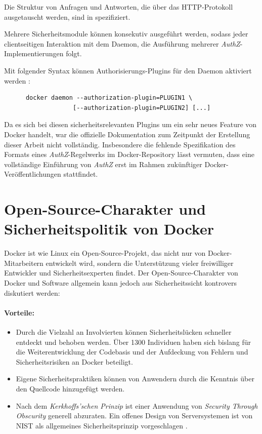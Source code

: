 \documentclass[../main.tex]{subfiles}
\begin{document}
    Die Struktur von Anfragen und Antworten, die über das HTTP-Protokoll ausgetauscht werden, sind in \cite{githubAuthZExtended} spezifiziert.

    Mehrere Sicherheitsmodule können konsekutiv ausgeführt werden, sodass jeder clientseitigen Interaktion mit dem Daemon, die Ausführung mehrerer \emph{AuthZ}-Implementierungen folgt.

    Mit folgender Syntax können Authorisierungs-Plugins für den Daemon aktiviert werden \cite{githubAuthZExtended}:

    \begin{lstlisting}
      docker daemon --authorization-plugin=PLUGIN1 \
                   [--authorization-plugin=PLUGIN2] [...]
    \end{lstlisting}

    Da es sich bei diesen sicherheitsrelevanten Plugins um ein sehr neues Feature von Docker handelt, war die offizielle Dokumentation zum Zeitpunkt der Erstellung dieser Arbeit nicht vollständig. Insbesondere die fehlende Spezifikation des Formats eines \emph{AuthZ}-Regelwerks im Docker-Repository lässt vermuten, dass eine vollständige Einführung von \emph{AuthZ} erst im Rahmen zukünftiger Docker-Veröffentlichungen stattfindet.

  \section{Open-Source-Charakter und Sicherheitspolitik von Docker}
  \label{opensource}
    Docker ist wie Linux ein Open-Source-Projekt, das nicht nur von Docker-Mitarbeitern entwickelt wird, sondern die Unterstützung vieler freiwilliger Entwickler und Sicherheitsexperten findet. Der Open-Source-Charakter von Docker und Software allgemein kann jedoch aus Sicherheitssicht kontrovers diskutiert werden:

    \paragraph{Vorteile:}
    \begin{itemize}
      \item Durch die Vielzahl an Involvierten können Sicherheitslücken schneller entdeckt und behoben werden. Über 1300 Individuen haben sich bislang für die Weiterentwicklung der Codebasis und der Aufdeckung von Fehlern und Sicherheitsrisiken an Docker beteiligt.
      \item Eigene Sicherheitspraktiken können von Anwendern durch die Kenntnis über den Quellcode hinzugefügt werden.
      \item Nach dem \emph{Kerkhoffs'schen Prinzip} ist einer Anwendung von \emph{Security Through Obscurity} generell abzuraten. Ein offenes Design von Serversystemen ist von NIST als allgemeines Sicherheitsprinzip vorgeschlagen \cite[S.15]{nist}.
    \end{itemize}
\end{document}
